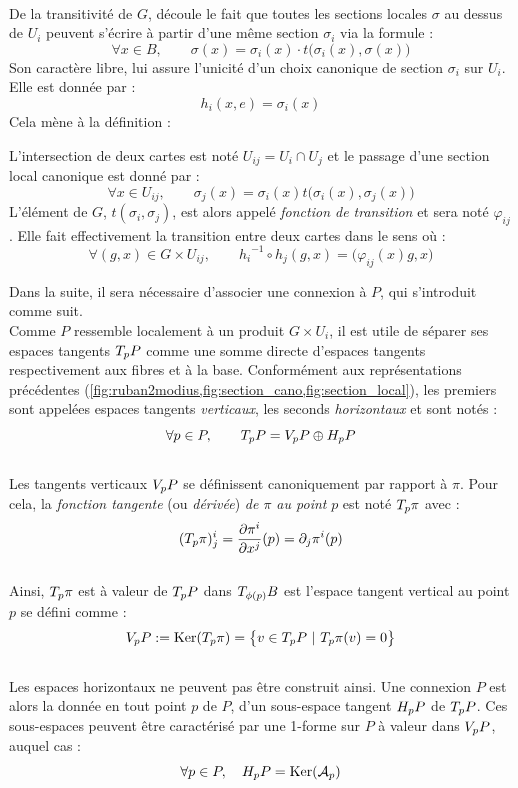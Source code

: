 \\
De la transitivité de $G$, découle le fait que toutes les sections locales $\sigma$ au dessus de $U_i$ peuvent s'écrire à partir d'une même section $\sigma_i$ via la formule :
\[\forall x\in B,\qquad \sigma(x) = \sigma_i(x) \cdot t\big(\sigma_i(x), \sigma(x)\big)\]
Son caractère libre, lui assure l'unicité d'un choix canonique de section $\sigma_i$ sur $U_i$. Elle est donnée par :
\[{h_i}(x,e) = \sigma_i(x)\]
Cela mène à la définition :
\begin{definition}
	L'intersection de deux cartes  est noté $U_{ij} = U_i\cap U_j$ et le passage d'une section local canonique est donné par :
	\[\forall x\in U_{ij},\qquad \sigma_j(x) = \sigma_i(x) t\big(\sigma_i(x), \sigma_j(x)\big)\]
	L'élément de $G$, $t(\sigma_i, \sigma_j)$, est alors appelé \emph{fonction de transition} et sera noté $\varphi_{ij}$. Elle fait effectivement la transition entre deux cartes dans le sens où :
	\[\forall (g,x)\in G\times U_{ij},\qquad {h_i}^{-1} \circ h_j(g,x) = \big( \varphi_{ij}(x)g, x \big)\]
\end{definition}
\skipl

Dans la suite, il sera nécessaire d'associer une connexion à $P$, qui s'introduit comme suit.
\\
Comme $P$ ressemble localement à un produit $G\times U_i$, il est utile de séparer ses espaces tangents $\tg[p]{P}$ comme une somme directe d'espaces tangents respectivement aux fibres et à la base. Conformément aux représentations précédentes (\cref{fig:ruban2modius,fig:section_cano,fig:section_local}), les premiers sont appelées espaces tangents \emph{verticaux}, les seconds \emph{horizontaux} et sont notés :
\[\forall p\in P,\qquad \tg[p]{P} = \vg[p]{P} \oplus \hg[p]{P}\]
\\
Les tangents verticaux $\vg[p]{P}$ se définissent canoniquement par rapport à $\pi$. Pour cela, la \emph{fonction tangente} (ou \emph{dérivée}) \emph{de $\pi$ au point} $p$ est noté $\tg[p]{\pi}$ avec :
\[(\tg[p]{\pi})^i_j = \frac{\partial \pi^i}{\partial x^j}(p) = \partial_j\pi^i(p)\]
\\
Ainsi, $\tg[p]{\pi}$ est à valeur de $\tg[p]{P}$ dans $\tg[\phi(p)]{B}$ est l'espace tangent vertical au point $p$ se défini comme :
\[\vg[p]{P} \defeq \Ker (\tg[p]{\pi}) = \big\{ v\in\tg[p]{P}\ |\ \tg[p]{\pi}(v)=0 \big\}\]
\\ 
Les espaces horizontaux ne peuvent pas être construit ainsi. Une connexion $P$ est alors la donnée en tout point $p$ de $P$, d'un sous-espace tangent $\hg[p]{P}$ de $\tg[p]{P}$.
Ces sous-espaces peuvent être caractérisé par une 1-forme sur $P$ à valeur dans $\vg[p]{P}$, auquel cas :
\[\forall p\in P,\quad \hg[p]{P} = \Ker(\mathcal{A}_p)\]
\skipl

